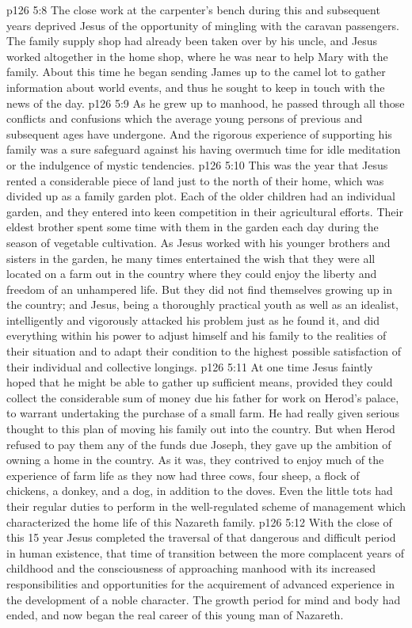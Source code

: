 \vs p126 5:8 The close work at the carpenter’s bench during this and subsequent years deprived Jesus of the opportunity of mingling with the caravan passengers. The family supply shop had already been taken over by his uncle, and Jesus worked altogether in the home shop, where he was near to help Mary with the family. About this time he began sending James up to the camel lot to gather information about world events, and thus he sought to keep in touch with the news of the day.
\vs p126 5:9 As he grew up to manhood, he passed through all those conflicts and confusions which the average young persons of previous and subsequent ages have undergone. And the rigorous experience of supporting his family was a sure safeguard against his having overmuch time for idle meditation or the indulgence of mystic tendencies.
\vs p126 5:10 \pc This was the year that Jesus rented a considerable piece of land just to the north of their home, which was divided up as a family garden plot. Each of the older children had an individual garden, and they entered into keen competition in their agricultural efforts. Their eldest brother spent some time with them in the garden each day during the season of vegetable cultivation. As Jesus worked with his younger brothers and sisters in the garden, he many times entertained the wish that they were all located on a farm out in the country where they could enjoy the liberty and freedom of an unhampered life. But they did not find themselves growing up in the country; and Jesus, being a thoroughly practical youth as well as an idealist, intelligently and vigorously attacked his problem just as he found it, and did everything within his power to adjust himself and his family to the realities of their situation and to adapt their condition to the highest possible satisfaction of their individual and collective longings.
\vs p126 5:11 At one time Jesus faintly hoped that he might be able to gather up sufficient means, provided they could collect the considerable sum of money due his father for work on Herod’s palace, to warrant undertaking the purchase of a small farm. He had really given serious thought to this plan of moving his family out into the country. But when Herod refused to pay them any of the funds due Joseph, they gave up the ambition of owning a home in the country. As it was, they contrived to enjoy much of the experience of farm life as they now had three cows, four sheep, a flock of chickens, a donkey, and a dog, in addition to the doves. Even the little tots had their regular duties to perform in the well\hyp{}regulated scheme of management which characterized the home life of this Nazareth family.
\vs p126 5:12 \pc With the close of this 15 year Jesus completed the traversal of that dangerous and difficult period in human existence, that time of transition between the more complacent years of childhood and the consciousness of approaching manhood with its increased responsibilities and opportunities for the acquirement of advanced experience in the development of a noble character. The growth period for mind and body had ended, and now began the real career of this young man of Nazareth.

